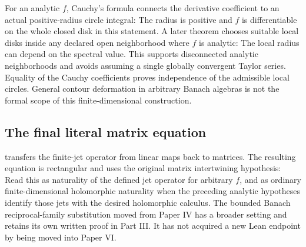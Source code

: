 For an analytic $f$, Cauchy's formula connects the derivative coefficient to an actual positive-radius circle integral:
The radius is positive and $f$ is differentiable on the whole closed disk in this statement. A later theorem chooses suitable local disks inside any declared open neighborhood where $f$ is analytic:
The local radius can depend on the spectral value. This supports disconnected analytic neighborhoods and avoids assuming a single globally convergent Taylor series. Equality of the Cauchy coefficients proves independence of the admissible local circles. General contour deformation in arbitrary Banach algebras is not the formal scope of this finite-dimensional construction.

\subsection{The final literal matrix equation}
 transfers the finite-jet operator from linear maps back to matrices. The resulting equation is rectangular and uses the original matrix intertwining hypothesis:
Read this as naturality of the defined jet operator for arbitrary $f$, and as ordinary finite-dimensional holomorphic naturality when the preceding analytic hypotheses identify those jets with the desired holomorphic calculus. The bounded Banach reciprocal-family substitution moved from Paper IV has a broader setting and retains its own written proof in Part III. It has not acquired a new Lean endpoint by being moved into Paper VI.
